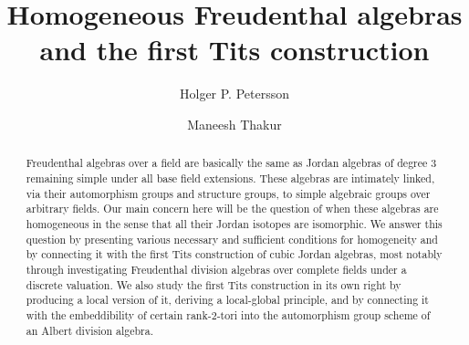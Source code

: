 \documentclass{amsart}
\theoremstyle{definition} %
\theoremstyle{remark} %
\renewcommand{\:}{\colon\,}
\numberwithin{equation}{section}
\begin{document}
\title{Homogeneous Freudenthal algebras and the first Tits construction}


\author[H.P. Petersson]{Holger P. Petersson}
\address{Petersson: Fakult\"at f\"ur Mathematik und Informatik, FernUniversit\"at in Hagen, D-58084 Hagen, Germany}


\author[M. Thakur]{Maneesh Thakur}
\address{Thakur: Indian Statistical Institute, Stat-Math.-Unit, 8th Mile Mysore Road, Bangalore-560059, India}


\begin{abstract}
Freudenthal algebras over a field are basically the same as Jordan algebras of degree $3$ remaining simple under all base field extensions. These algebras are intimately linked, via their automorphism groups and structure groups, to simple algebraic groups over arbitrary fields. Our main concern  here will be the question of when these algebras are homogeneous in the sense that all their Jordan isotopes are isomorphic. We answer this question by presenting various necessary and sufficient conditions for homogeneity and by connecting it with the first Tits construction of cubic Jordan algebras, most notably through investigating Freudenthal division algebras over complete fields under a discrete valuation. We also study the first Tits construction in its own right by producing a local version of it, deriving a local-global principle, and by connecting it with the embeddibility of certain rank-$2$-tori into the automorphism group scheme of an Albert division algebra.
\end{abstract}
%

\maketitle
\end{document}
